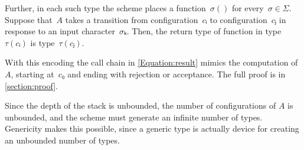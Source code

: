 \documentclass[a4paper,USenglish]{lipics-v2016}
\begin{document}
Further, in each such type the scheme places
  a function~$σ()$ for every~$σ∈Σ$.
Suppose that~$A$ takes a transition from configuration~$cᵢ$ to configuration~$cⱼ$
  in response to an input character~$σₖ$.
Then, the return type of function  in type~$τ(cᵢ)$ is type~$τ(cⱼ)$.

With this encoding the call chain in \cref{Equation:result}
  mimics the computation of~$A$, starting at~$c₀$ and ending with
  rejection or acceptance.
The full proof is in \cref{section:proof}.

Since the depth of the stack is unbounded, the number of configurations of $A$ is unbounded,
  and the scheme must generate an infinite number of types.
Genericity makes this possible, since a generic type is
  actually device for creating an unbounded number of types.
\end{document}
